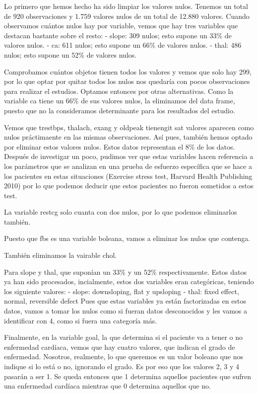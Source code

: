 \documentclass[
]{article}
\begin{document}
Lo primero que hemos hecho ha sido limpiar los valores nulos. Tenemos un
total de 920 observaciones y 1.759 valores nulos de un total de 12.880
valores. Cuando observamos cuántos nulos hay por variable, vemos que hay
tres variables que destacan bastante sobre el resto: - slope: 309 nulos;
esto supone un 33\% de valores nulos. - ca: 611 nulos; esto supone un
66\% de valores nulos. - thal: 486 nulos; esto supone un 52\% de valores
nulos.

Comprobamos cuántos objetos tienen todos los valores y vemos que solo
hay 299, por lo que optar por quitar todos los nulos nos quedaría con
pocos observaciones para realizar el estudios. Optamos entonces por
otras alternativas. Como la variable ca tiene un 66\% de sus valores
nulos, la eliminamos del data frame, puesto que no la consideramos
determinante para los resultados del estudio.

Vemos que trestbps, thalach, exang y oldpeak tienengit sat valores
aparecen como nulos práctimaente en las mismas observaciones. Así pues,
también hemos optado por eliminar estos valores nulos. Estos datos
representan el 8\% de los datos. Después de investigar un poco, pudimos
ver que estas variables hacen referencia a los parámetros que se
analizan en una prueba de esfuerzo específica que se hace a los
pacientes en estas situaciones (Exercise stress test, Harvard Health
Publishing 2010) por lo que podemos deducir que estos pacientes no
fueron sometidos a estos test.

La variable restcg solo cuanta con dos nulos, por lo que podemos
eliminarlos también.

Puesto que fbs es una variable boleana, vamos a eliminar los nulos que
contenga.

También eliminamos la vairable chol.

Para slope y thal, que suponían un 33\% y un 52\% respectivamente. Estos
datos ya han sido procesados, incialmente, estos dos variables eran
categóricas, teniendo los siguiente valores: - slope: downsloping, flat
y upsloping - thal: fixed effect, normal, reversible defect Pues que
estas variables ya están factorizadas en estos datos, vamos a tomar los
nulos como si fueran datos desconocidos y les vamos a identificar con 4,
como si fuera una categoría más.

Finalmente, en la variable goal, la que determina si el paciente va a
tener o no enfermedad cardíaca, vemos que hay cuatro valores, que
indican el grado de enfermedad. Nosotros, realmente, lo que queremos es
un valor boleano que nos indique si lo está o no, ignorando el grado. Es
por eso que los valores 2, 3 y 4 pasarán a ser 1. Se queda entonces que
1 determina aquellos pacientes que sufren una enfermedad cardíaca
mientras que 0 determina aquellos que no.
\end{document}

